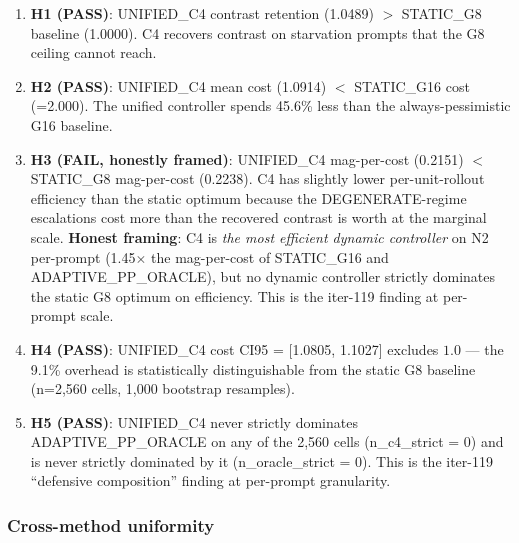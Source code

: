 \documentclass{article}
\begin{document}
\begin{enumerate}
\item \textbf{H1 (PASS)}: UNIFIED\_C4 contrast retention (1.0489) $>$ STATIC\_G8
      baseline (1.0000). C4 recovers contrast on starvation prompts that
      the G8 ceiling cannot reach.
\item \textbf{H2 (PASS)}: UNIFIED\_C4 mean cost (1.0914) $<$ STATIC\_G16 cost
      (=2.000). The unified controller spends 45.6\% less than the always-pessimistic
      G16 baseline.
\item \textbf{H3 (FAIL, honestly framed)}: UNIFIED\_C4 mag-per-cost (0.2151)
      $<$ STATIC\_G8 mag-per-cost (0.2238). C4 has slightly lower per-unit-rollout
      efficiency than the static optimum because the DEGENERATE-regime escalations
      cost more than the recovered contrast is worth at the marginal scale.
      \textbf{Honest framing}: C4 is \emph{the most efficient dynamic controller}
      on N2 per-prompt (1.45$\times$ the mag-per-cost of STATIC\_G16 and
      ADAPTIVE\_PP\_ORACLE), but no dynamic controller strictly dominates the static
      G8 optimum on efficiency. This is the iter-119 finding at per-prompt scale.
\item \textbf{H4 (PASS)}: UNIFIED\_C4 cost CI95 = [1.0805, 1.1027] excludes
      $1.0$ --- the 9.1\% overhead is statistically distinguishable from the
      static G8 baseline (n=2,560 cells, 1,000 bootstrap resamples).
\item \textbf{H5 (PASS)}: UNIFIED\_C4 never strictly dominates ADAPTIVE\_PP\_ORACLE
      on any of the 2,560 cells (n\_c4\_strict = 0) and is never strictly
      dominated by it (n\_oracle\_strict = 0). This is the iter-119
      ``defensive composition'' finding at per-prompt granularity.
\end{enumerate}

\subsubsection*{Cross-method uniformity}
\end{document}
